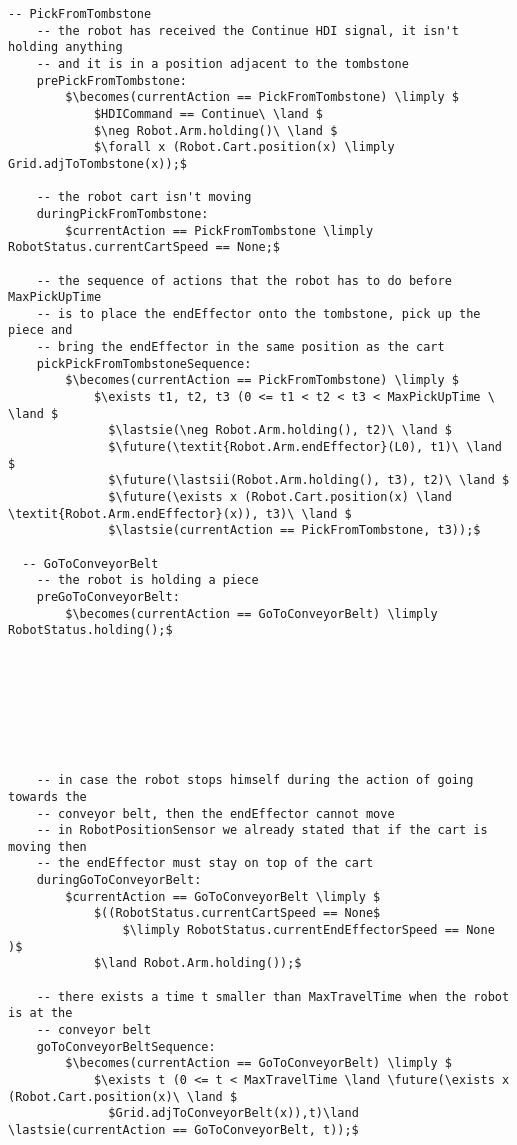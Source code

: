 \begin{lstlisting}[fontadjust, mathescape, frame=single]
  -- PickFromTombstone
    -- the robot has received the Continue HDI signal, it isn't holding anything 
    -- and it is in a position adjacent to the tombstone
    prePickFromTombstone:
        $\becomes(currentAction == PickFromTombstone) \limply $
            $HDICommand == Continue\ \land $
            $\neg Robot.Arm.holding()\ \land $
            $\forall x (Robot.Cart.position(x) \limply Grid.adjToTombstone(x));$

    -- the robot cart isn't moving
    duringPickFromTombstone:
        $currentAction == PickFromTombstone \limply RobotStatus.currentCartSpeed == None;$

    -- the sequence of actions that the robot has to do before MaxPickUpTime 
    -- is to place the endEffector onto the tombstone, pick up the piece and 
    -- bring the endEffector in the same position as the cart
    pickPickFromTombstoneSequence:
        $\becomes(currentAction == PickFromTombstone) \limply $
            $\exists t1, t2, t3 (0 <= t1 < t2 < t3 < MaxPickUpTime \ \land $
              $\lastsie(\neg Robot.Arm.holding(), t2)\ \land $
              $\future(\textit{Robot.Arm.endEffector}(L0), t1)\ \land $
              $\future(\lastsii(Robot.Arm.holding(), t3), t2)\ \land $
              $\future(\exists x (Robot.Cart.position(x) \land \textit{Robot.Arm.endEffector}(x)), t3)\ \land $
              $\lastsie(currentAction == PickFromTombstone, t3));$
    
  -- GoToConveyorBelt
    -- the robot is holding a piece
    preGoToConveyorBelt:
        $\becomes(currentAction == GoToConveyorBelt) \limply RobotStatus.holding();$
    







    -- in case the robot stops himself during the action of going towards the 
    -- conveyor belt, then the endEffector cannot move 
    -- in RobotPositionSensor we already stated that if the cart is moving then 
    -- the endEffector must stay on top of the cart
    duringGoToConveyorBelt:
        $currentAction == GoToConveyorBelt \limply $
            $((RobotStatus.currentCartSpeed == None$ 
                $\limply RobotStatus.currentEndEffectorSpeed == None )$
            $\land Robot.Arm.holding());$

    -- there exists a time t smaller than MaxTravelTime when the robot is at the 
    -- conveyor belt
    goToConveyorBeltSequence:
        $\becomes(currentAction == GoToConveyorBelt) \limply $
            $\exists t (0 <= t < MaxTravelTime \land \future(\exists x (Robot.Cart.position(x)\ \land $
              $Grid.adjToConveyorBelt(x)),t)\land \lastsie(currentAction == GoToConveyorBelt, t));$
      

\end{lstlisting}
